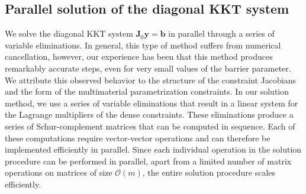 \documentclass[12pt]{article}
\newcommand{\mb}{\mathbf}
\begin{document}
\subsection{Parallel solution of the diagonal KKT system}

We solve the diagonal KKT system $\mb{J}_{0} \mb{y} = \mb{b}$ in
parallel through a series of variable eliminations. In general, this
type of method suffers from numerical cancellation, however, our
experience has been that this method produces remarkably accurate
steps, even for very small values of the barrier parameter.  We
attribute this observed behavior to the structure of the constraint
Jacobians and the form of the multimaterial parametrization
constraints. In our solution method, we use a series of variable
eliminations that result in a linear system for the Lagrange
multipliers of the dense constraints.  These eliminations produce a
series of Schur-complement matrices that can be computed in sequence.
Each of these computations require vector-vector operations and can
therefore be implemented efficiently in parallel. Since each
individual operation in the solution procedure can be performed in
parallel, apart from a limited number of matrix operations on matrices
of size $\mathcal{O}(m)$, the entire solution procedure scales
efficiently.
\end{document}
